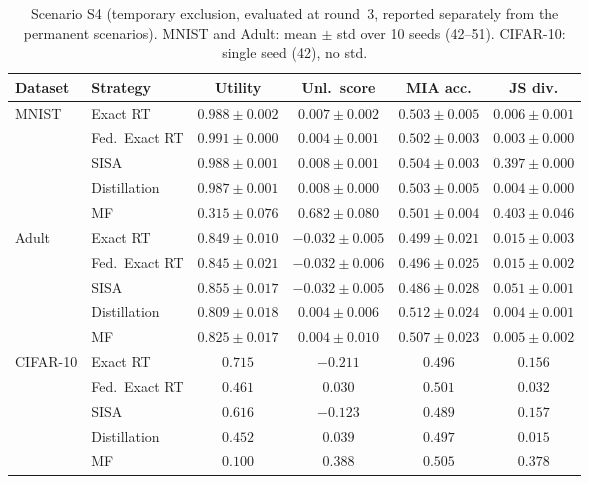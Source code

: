 \begin{table}[H]
\centering
\caption{Scenario S4 (temporary exclusion, evaluated at round~3, reported separately from the permanent scenarios). MNIST and Adult: mean $\pm$ std over 10 seeds (42--51). CIFAR-10: single seed (42), no std.}
\label{tab:s4}
\small
\renewcommand{\arraystretch}{1.2}
\begin{tabular}{@{} l l c c c c @{}}
\toprule
\textbf{Dataset} & \textbf{Strategy} & \textbf{Utility} & \textbf{Unl.\ score} & \textbf{MIA acc.} & \textbf{JS div.} \\
\midrule
\multirow{5}{*}{MNIST} & Exact RT & $0.988 \pm 0.002$ & $0.007 \pm 0.002$ & $0.503 \pm 0.005$ & $0.006 \pm 0.001$ \\
 & Fed.\ Exact RT & $0.991 \pm 0.000$ & $0.004 \pm 0.001$ & $0.502 \pm 0.003$ & $0.003 \pm 0.000$ \\
 & SISA & $0.988 \pm 0.001$ & $0.008 \pm 0.001$ & $0.504 \pm 0.003$ & $0.397 \pm 0.000$ \\
 & Distillation & $0.987 \pm 0.001$ & $0.008 \pm 0.000$ & $0.503 \pm 0.005$ & $0.004 \pm 0.000$ \\
 & MF & $0.315 \pm 0.076$ & $0.682 \pm 0.080$ & $0.501 \pm 0.004$ & $0.403 \pm 0.046$ \\
\midrule
\multirow{5}{*}{Adult} & Exact RT & $0.849 \pm 0.010$ & $-0.032 \pm 0.005$ & $0.499 \pm 0.021$ & $0.015 \pm 0.003$ \\
 & Fed.\ Exact RT & $0.845 \pm 0.021$ & $-0.032 \pm 0.006$ & $0.496 \pm 0.025$ & $0.015 \pm 0.002$ \\
 & SISA & $0.855 \pm 0.017$ & $-0.032 \pm 0.005$ & $0.486 \pm 0.028$ & $0.051 \pm 0.001$ \\
 & Distillation & $0.809 \pm 0.018$ & $0.004 \pm 0.006$ & $0.512 \pm 0.024$ & $0.004 \pm 0.001$ \\
 & MF & $0.825 \pm 0.017$ & $0.004 \pm 0.010$ & $0.507 \pm 0.023$ & $0.005 \pm 0.002$ \\
\midrule
\multirow{5}{*}{CIFAR-10} & Exact RT & $0.715$ & $-0.211$ & $0.496$ & $0.156$ \\
 & Fed.\ Exact RT & $0.461$ & $0.030$ & $0.501$ & $0.032$ \\
 & SISA & $0.616$ & $-0.123$ & $0.489$ & $0.157$ \\
 & Distillation & $0.452$ & $0.039$ & $0.497$ & $0.015$ \\
 & MF & $0.100$ & $0.388$ & $0.505$ & $0.378$ \\
\bottomrule
\end{tabular}
\end{table}
